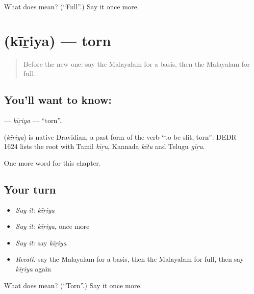 \begin{tcolorbox}[breakable,colback=teal!4,colframe=teal!35!black,title={Before you move on}]
What does  mean? (\textquotedblleft{}Full\textquotedblright{}.) Say it once more.
\end{tcolorbox}
\section[\texorpdfstring{\ml{കീറിയ} (kīṟiya)}{കീറിയ (kīṟiya)}]{ (kīṟiya) — torn}

\label{lesson:ML-C244-kiriya}



\begin{quote}
Before the new one: say the Malayalam for a basis, then the Malayalam for full.
\end{quote}

\subsection*{You'll want to know: }
\textbf{} — \emph{kīṟiya} — \textquotedblleft{}torn\textquotedblright{}.

\begin{cousinweb}
\textbf{} (\emph{kīṟiya}) is native Dravidian, a past form of the verb \textquotedblleft{}to be slit, torn\textquotedblright{}; DEDR 1624 lists the root with Tamil \emph{kīṟu}, Kannada \emph{kītu} and Telugu \emph{gīṟu}.
\end{cousinweb}

\begin{grammarlens}[title={What you've built}]
One more word for this chapter.
\end{grammarlens}

\subsection*{Your turn}
\begin{itemize}
\raggedright
  \item \emph{Say it:} \emph{kīṟiya}
  \item \emph{Say it:} \emph{kīṟiya}, once more
  \item \emph{Say it:} say \emph{kīṟiya}
  \item \emph{Recall:} say the Malayalam for a basis, then the Malayalam for full, then say \emph{kīṟiya} again
\end{itemize}

\begin{tcolorbox}[breakable,colback=teal!4,colframe=teal!35!black,title={Before you move on}]
What does  mean? (\textquotedblleft{}Torn\textquotedblright{}.) Say it once more.
\end{tcolorbox}
